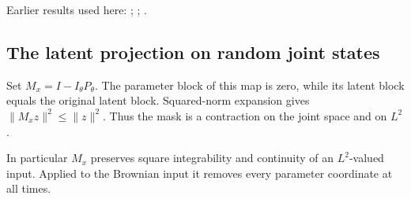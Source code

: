 \documentclass[11pt,a4paper]{report}
\begin{document}
Earlier results used here: \cite[Section~3.1.1]{LangevinLean2026IPLA}; \cite[Section~3.3.1]{LangevinLean2026IPLA}; \cite[Section~3.9.1]{LangevinLean2026IPLA}.
\subsection{\texorpdfstring{The latent projection on random joint states}{The latent projection on random joint states}}
\label{report-step-ProximalLangevin-MeanFieldProcess-lean-3}


Set \(M_x=I-I_\theta P_\theta\). The parameter block of this map is zero, while its latent block equals the original latent block. Squared-norm expansion gives \(\|M_xz\|^2\le\|z\|^2\). Thus the mask is a contraction on the joint space and on \(L^2\).



In particular \(M_x\) preserves square integrability and continuity of an \(L^2\)-valued input. Applied to the Brownian input it removes every parameter coordinate at all times.
\end{document}
